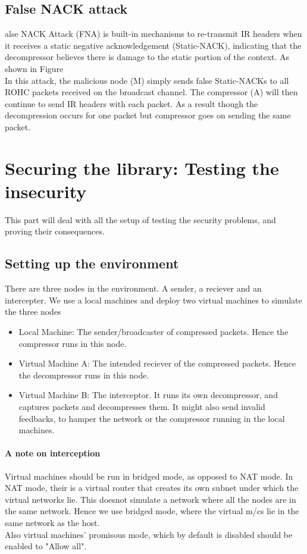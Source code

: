 \documentclass[a4paper,11pt]{article}
\begin{document}
\subsection{False NACK attack}
alse NACK Attack (FNA) is  built-in mechanisms to re-transmit IR headers
when it receives a static negative acknowledgement (Static-NACK), indicating that the decompressor believes there is
damage to the static portion of the context. As shown in Figure\\
In this attack, the malicious node (M) simply sends false Static-NACKs to all ROHC packets received on the broadcast channel. The compressor (A) will then continue to send IR headers with each packet. As a result though the decompression occurs for one packet but compressor goes on sending the same packet.



\pagebreak
\section{Securing the library: Testing the insecurity}
This part will deal with all the setup of testing the security problems, and proving their consequences.
\subsection{Setting up the environment}
There are three nodes in the environment. A sender, a reciever and an intercepter. We use a local machines and deploy two virtual machines
to simulate the three nodes
\begin{itemize}
	\item Local Machine: The sender/broadcaster of compressed packets. Hence the compressor runs in this node.
	\item Virtual Machine A: The intended reciever of the compressed packets. Hence the decompressor runs in this node.
	\item Virtual Machine B: The interceptor. It runs its own decompressor, and captures packets and decompresses them. It might also send
	invalid feedbacks, to hamper the network or the compressor running in the local machines.
\end{itemize}

\paragraph{A note on interception} 
Virtual machines should be run in bridged mode, as opposed to NAT mode. In NAT mode, their is a virtual router that creates
its own subnet under which the virtual networks lie. This doesnot simulate a network where all the nodes
are in the same network. Hence we use bridged mode, where the virtual m/cs lie in the same network as the host. \\
Also virtual machines' promisous mode, which by default is disabled should be enabled to "Allow all".
\end{document}
